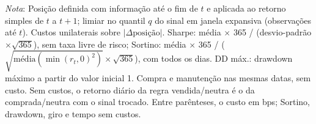 \begin{table}[H]
\centering
\small
\caption{Estratégias com o BVRP previsto pelo Ridge, por quantil (27/02/2024 a 02/03/2026).}
\label{tab:estr-quantis}
\par\smallskip
\parbox{0.95\linewidth}{\footnotesize\textit{Nota}: Posição definida com informação até o fim de $t$ e aplicada ao retorno simples de $t$ a $t+1$; limiar no quantil $q$ do sinal em janela expansiva (observações até $t$). Custos unilaterais sobre $|\Delta \text{posição}|$. Sharpe: média $\times$ 365 / (desvio-padrão $\times \sqrt{365}$), sem taxa livre de risco; Sortino: média $\times$ 365 / ($\sqrt{\text{média}(\min(r_t, 0)^2)} \times \sqrt{365}$), com todos os dias. DD máx.: drawdown máximo a partir do valor inicial 1. Compra e manutenção nas mesmas datas, sem custo. Sem custos, o retorno diário da regra vendida/neutra é o da comprada/neutra com o sinal trocado. Entre parênteses, o custo em bps; Sortino, drawdown, giro e tempo sem custos.}
\end{table}
